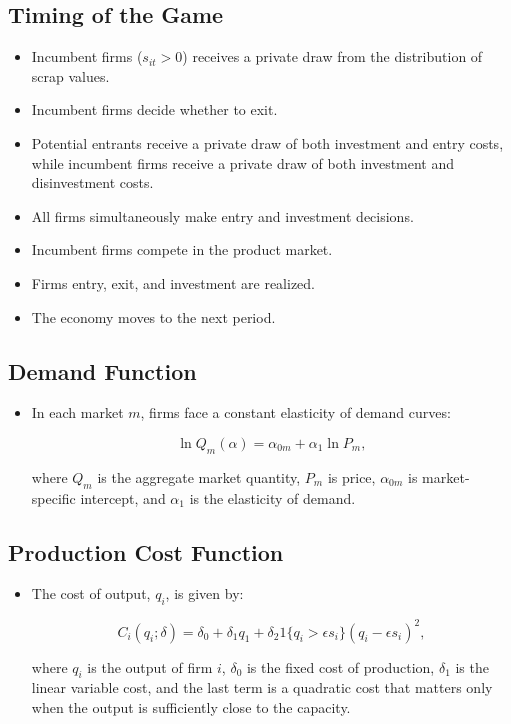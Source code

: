 \documentclass[]{book}
\providecommand{\tightlist}{%
  \setlength{\itemsep}{0pt}\setlength{\parskip}{0pt}}
\begin{document}
\subsection{Timing of the Game}\label{timing-of-the-game}

\begin{itemize}
\tightlist
\item
  Incumbent firms (\(s_{it} > 0\)) receives a private draw from the
  distribution of scrap values.
\item
  Incumbent firms decide whether to exit.
\item
  Potential entrants receive a private draw of both investment and entry
  costs, while incumbent firms receive a private draw of both investment
  and disinvestment costs.
\item
  All firms simultaneously make entry and investment decisions.
\item
  Incumbent firms compete in the product market.
\item
  Firms entry, exit, and investment are realized.
\item
  The economy moves to the next period.
\end{itemize}

\subsection{Demand Function}\label{demand-function}

\begin{itemize}
\tightlist
\item
  In each market \(m\), firms face a constant elasticity of demand
  curves:

  \begin{equation}
  \ln Q_m(\alpha) = \alpha_{0m} + \alpha_1 \ln P_m,
  \end{equation}

  where \(Q_m\) is the aggregate market quantity, \(P_m\) is price,
  \(\alpha_{0m}\) is market-specific intercept, and \(\alpha_1\) is the
  elasticity of demand.
\end{itemize}

\subsection{Production Cost Function}\label{production-cost-function}

\begin{itemize}
\tightlist
\item
  The cost of output, \(q_i\), is given by:

  \begin{equation}
  C_i(q_i; \delta) = \delta_0 + \delta_1 q_1 + \delta_2 1\{q_i > \epsilon s_i\}(q_i - \epsilon s_i)^2,
  \end{equation}

  where \(q_i\) is the output of firm \(i\), \(\delta_0\) is the fixed
  cost of production, \(\delta_1\) is the linear variable cost, and the
  last term is a quadratic cost that matters only when the output is
  sufficiently close to the capacity.
\end{itemize}
\end{document}
